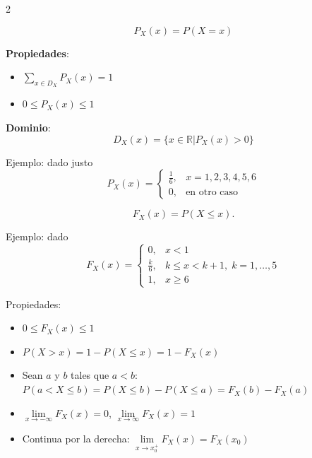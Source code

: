 \documentclass[10pt,a4paper]{article}
\begin{document}
\begin{multicols}{2}
    \begin{tcolorbox}[title=Función de Probabilidad, equal height group=VA1]
        \[ P_X(x) = P(X = x)\]

        \textbf{Propiedades}:
        \begin{itemize}
            \item $\sum_{x \in D_X} P_X(x) = 1$
            \item $0 \leq P_X(x) \leq 1$
        \end{itemize}

        \textbf{Dominio}:
        \[ D_X(x) = \{ x \in \mathbb{R} \vert P_X(x) > 0 \} \]

        Ejemplo: dado justo
        \[
            P_X(x) = \begin{cases}
                \frac{1}{6}, & x = 1,2,3,4,5,6 \\
                0, & \text{en otro caso}
            \end{cases}
        \]

    \end{tcolorbox}
    \begin{tcolorbox}[title=Función de Distribución Acumulada (CDF), equal height group=VA1]
        \[ F_X(x) = P(X \leq x).  \]
        
        Ejemplo: dado
        \[
            F_X(x) = \begin{cases}
                0, & x < 1 \\
                \frac{k}{6}, & k \leq x < k+1, \; k=1,\dots,5 \\
                1, & x \geq 6
            \end{cases}
        \]

        Propiedades:
        \begin{itemize}
            \item $0 \leq F_X(x) \leq 1$ 
            \item $P(X > x) = 1 - P(X \leq x) = 1 - F_X(x)$ 
            \item Sean $a$ y $b$ tales que $a < b$: \\ $P(a < X \leq b) = P(X \leq b) - P(X \leq a) = F_X(b) - F_X(a)$
            \item $\lim\limits_{x\to-\infty}{F_X(x)} = 0$, $\lim\limits_{x\to\infty}{F_X(x)} = 1$
            \item Continua por la derecha: $\lim\limits_{x\to x_0^+}{F_X(x)} = F_X(x_0)$
        \end{itemize}
    \end{tcolorbox}
\end{multicols}
\end{document}
